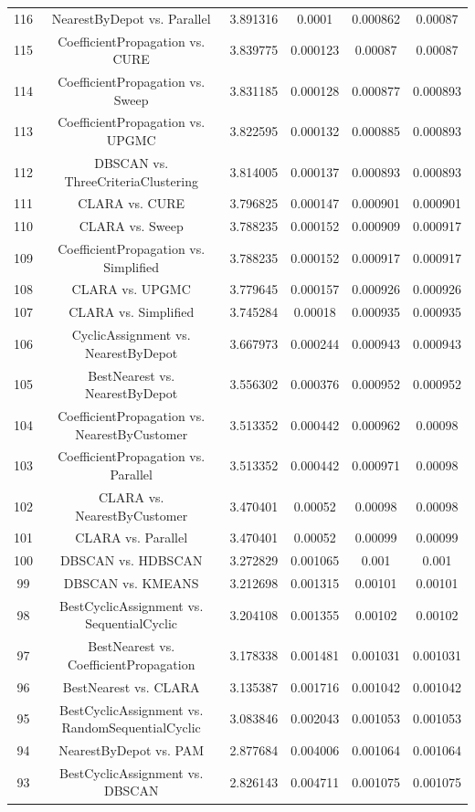 \documentclass[a4paper,10pt]{article}
\begin{document}
\begin{landscape}
\begin{table}[!htp]
\begin{tabular}{cccccc}
116&NearestByDepot vs. Parallel&3.891316&0.0001&0.000862&0.00087\\
115&CoefficientPropagation vs. CURE&3.839775&0.000123&0.00087&0.00087\\
114&CoefficientPropagation vs. Sweep&3.831185&0.000128&0.000877&0.000893\\
113&CoefficientPropagation vs. UPGMC&3.822595&0.000132&0.000885&0.000893\\
112&DBSCAN vs. ThreeCriteriaClustering&3.814005&0.000137&0.000893&0.000893\\
111&CLARA vs. CURE&3.796825&0.000147&0.000901&0.000901\\
110&CLARA vs. Sweep&3.788235&0.000152&0.000909&0.000917\\
109&CoefficientPropagation vs. Simplified&3.788235&0.000152&0.000917&0.000917\\
108&CLARA vs. UPGMC&3.779645&0.000157&0.000926&0.000926\\
107&CLARA vs. Simplified&3.745284&0.00018&0.000935&0.000935\\
106&CyclicAssignment vs. NearestByDepot&3.667973&0.000244&0.000943&0.000943\\
105&BestNearest vs. NearestByDepot&3.556302&0.000376&0.000952&0.000952\\
104&CoefficientPropagation vs. NearestByCustomer&3.513352&0.000442&0.000962&0.00098\\
103&CoefficientPropagation vs. Parallel&3.513352&0.000442&0.000971&0.00098\\
102&CLARA vs. NearestByCustomer&3.470401&0.00052&0.00098&0.00098\\
101&CLARA vs. Parallel&3.470401&0.00052&0.00099&0.00099\\
100&DBSCAN vs. HDBSCAN&3.272829&0.001065&0.001&0.001\\
99&DBSCAN vs. KMEANS&3.212698&0.001315&0.00101&0.00101\\
98&BestCyclicAssignment vs. SequentialCyclic&3.204108&0.001355&0.00102&0.00102\\
97&BestNearest vs. CoefficientPropagation&3.178338&0.001481&0.001031&0.001031\\
96&BestNearest vs. CLARA&3.135387&0.001716&0.001042&0.001042\\
95&BestCyclicAssignment vs. RandomSequentialCyclic&3.083846&0.002043&0.001053&0.001053\\
94&NearestByDepot vs. PAM&2.877684&0.004006&0.001064&0.001064\\
93&BestCyclicAssignment vs. DBSCAN&2.826143&0.004711&0.001075&0.001075\\

\end{tabular}
\end{table}
\end{landscape}
\end{document}
